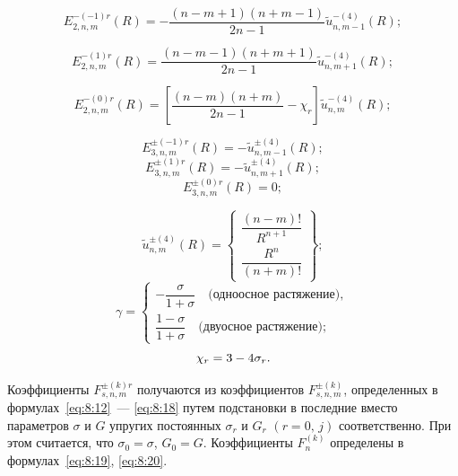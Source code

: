 \begin{equation}
E_{2,n,m}^{ - ( - 1)r}(R) =  - \frac{{(n - m + 1)(n + m - 1)}}{{2n - 1}}\tilde u_{n,m - 1}^{ - (4)}(R);
\end{equation}

\begin{equation}
E_{2,n,m}^{ - (1)r}(R) = \frac{{(n - m - 1)(n + m + 1)}}{{2n - 1}}\tilde u_{n,m + 1}^{ - (4)}(R);
\end{equation}

\begin{equation}
E_{2,n,m}^{ - (0)r}(R) = \left[ {\frac{{(n - m)(n + m)}}{{2n - 1}} - {\chi _r}} \right]\tilde u_{n,m}^{ - (4)}(R);
\end{equation}

\begin{equation}
E_{3,n,m}^{ \pm ( - 1)r}(R) =  - \tilde u_{n,m - 1}^{ \pm (4)}(R);
\end{equation}
\begin{equation}
E_{3,n,m}^{ \pm (1)r}(R) =  - \tilde u_{n,m + 1}^{ \pm (4)}(R);
\end{equation}
\begin{equation}
E_{3,n,m}^{ \pm (0)r}(R) = 0;
\end{equation}

\begin{equation}
\tilde u_{n,m}^{ \pm (4)}(R) = \left\{ \begin{array}{l}
\dfrac{{(n - m)!}}{{{R^{n + 1}}}}\\
\dfrac{{{R^n}}}{{(n + m)!}}
\end{array} \right\};
\label{eq:8:21a}
\end{equation}
\begin{equation}
\gamma  = \left\{ {\begin{array}{*{20}{l}}
{ - \dfrac{\sigma }{{1 + \sigma }}\quad\text{(одноосное растяжение)}},\\
{\dfrac{{1 - \sigma }}{{1 + \sigma }}\quad\text{(двуосное растяжение)}};
\end{array}} \right.
\label{eq:8:21b}
\end{equation}
$$
{\kern 1pt} {\chi _r} = 3 - 4{\sigma _r}.
$$

Коэффициенты $F_{s,n,m}^{\pm(k)r}$ получаются из коэффициентов $F_{s,n,m}^{\pm(k)}$, определенных в формулах~\eqref{eq:8:12}~--- \eqref{eq:8:18} путем подстановки в последние вместо параметров $\sigma$ и $G$ упругих постоянных $\sigma_r$ и $G_r$ $(r=0,\,j)$ соответственно. При этом считается, что $\sigma_0=\sigma$, $G_0=G$. Коэффициенты $F_n^{(k)}$ определены в формулах~\eqref{eq:8:19}, \eqref{eq:8:20}.

